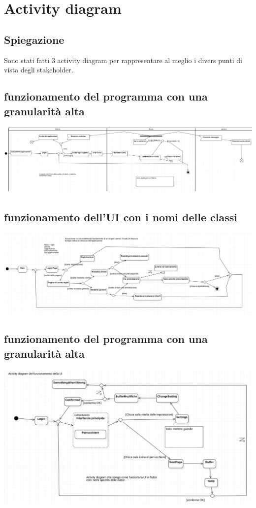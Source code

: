 \documentclass{article}
\begin{document}
\newpage
\section{Activity diagram} 
\subsection{Spiegazione}
Sono stati fatti 3 activity diagram per rappresentare al meglio 
i divers punti di vista degli stakeholder.
\subsection{funzionamento del programma con una granularità alta}
\includegraphics[scale = 0.38]{ImmaginiUML/Activity1.png}
\subsection{funzionamento dell'UI con i nomi delle classi}
\includegraphics[scale = 0.45]{ImmaginiUML/Activity2.png}
\subsection{funzionamento del programma con una granularità alta}
\includegraphics[scale = 0.5]{ImmaginiUML/Activity3.jpg}
\end{document}
